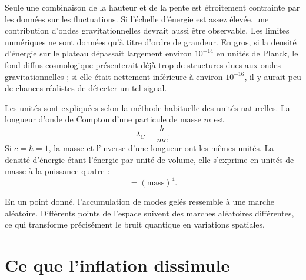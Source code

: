 Seule une combinaison de la hauteur et de la pente est étroitement contrainte par les données sur les fluctuations. Si l’échelle d’énergie est assez élevée, une contribution d’ondes gravitationnelles devrait aussi être observable. Les limites numériques ne sont données qu’à titre d’ordre de grandeur. En gros, si la densité d’énergie sur le plateau dépassait largement environ \(10^{-14}\) en unités de Planck, le fond diffus cosmologique présenterait déjà trop de structures dues aux ondes gravitationnelles ; si elle était nettement inférieure à environ \(10^{-16}\), il y aurait peu de chances réalistes de détecter un tel signal. 

Les unités sont expliquées selon la méthode habituelle des unités naturelles. La longueur d’onde de Compton d’une particule de masse \(m\) est
\begin{equation}
\lambda_C=\frac{\hbar}{mc}.
\end{equation}
Si \(c=\hbar=1\), la masse et l’inverse d’une longueur ont les mêmes unités. La densité d’énergie étant l’énergie par unité de volume, elle s’exprime en unités de masse à la puissance quatre :
\begin{equation}
[\rho]=(\mathrm{mass})^4.
\end{equation}

En un point donné, l’accumulation de modes gelés ressemble à une marche aléatoire. Différents points de l’espace suivent des marches aléatoires différentes, ce qui transforme précisément le bruit quantique en variations spatiales.

\begin{classroomqa}
\end{classroomqa}

\section{Ce que l’inflation dissimule}

